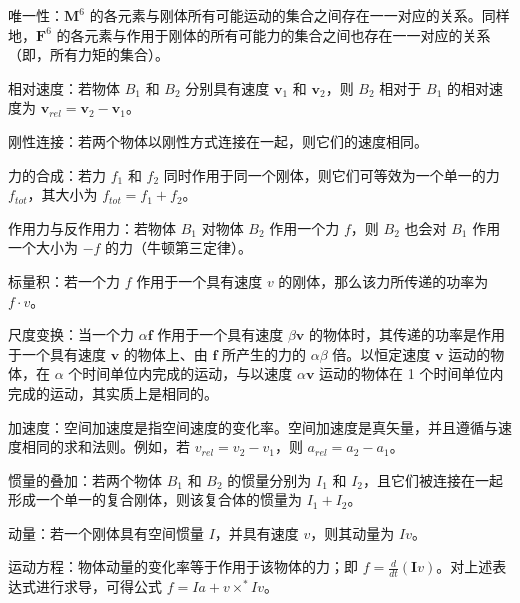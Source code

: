 \documentclass[10pt,a4paper]{book}
\theoremstyle{thmstyle} %
\theoremstyle{defstyle} %
\theoremstyle{prostyle} %
\begin{document}
唯一性：$\mathbf{M}^{6}$ 的各元素与刚体所有可能运动的集合之间存在一一对应的关系。同样地，$\mathbf{F}^{6}$ 的各元素与作用于刚体的所有可能力的集合之间也存在一一对应的关系（即，所有力矩的集合）。



相对速度：若物体 $B_{1}$ 和 $B_{2}$ 分别具有速度 $\boldsymbol{v}_{1}$ 和 $\boldsymbol{v}_{2}$，则 $B_{2}$ 相对于 $B_{1}$ 的相对速度为 $\boldsymbol{v}_{rel}=\boldsymbol{v}_{2}-\boldsymbol{v}_{1}$。



刚性连接：若两个物体以刚性方式连接在一起，则它们的速度相同。



力的合成：若力 $f_{1}$ 和 $f_{2}$ 同时作用于同一个刚体，则它们可等效为一个单一的力 $f_{tot}$，其大小为 $f_{tot} = f_{1} + f_{2}$。



作用力与反作用力：若物体 $B_{1}$ 对物体 $B_{2}$ 作用一个力 $f$，则 $B_{2}$ 也会对 $B_{1}$ 作用一个大小为 $-f$ 的力（牛顿第三定律）。



标量积：若一个力 $f$ 作用于一个具有速度 $v$ 的刚体，那么该力所传递的功率为 $f \cdot v$。



尺度变换：当一个力 $\alpha\boldsymbol{f}$ 作用于一个具有速度 $\beta\boldsymbol{v}$ 的物体时，其传递的功率是作用于一个具有速度 $\boldsymbol{v}$ 的物体上、由 $\boldsymbol{f}$ 所产生的力的 $\alpha\beta$ 倍。以恒定速度 $\boldsymbol{v}$ 运动的物体，在 $\alpha$ 个时间单位内完成的运动，与以速度 $\alpha\boldsymbol{v}$ 运动的物体在 1 个时间单位内完成的运动，其实质上是相同的。



加速度：空间加速度是指空间速度的变化率。空间加速度是真矢量，并且遵循与速度相同的求和法则。例如，若 $v_{rel} = v_2 - v_1$，则 $a_{rel} = a_2 - a_1$。



惯量的叠加：若两个物体 $B_{1}$ 和 $B_{2}$ 的惯量分别为 $I_{1}$ 和 $I_{2}$，且它们被连接在一起形成一个单一的复合刚体，则该复合体的惯量为 $I_{1} + I_{2}$。



动量：若一个刚体具有空间惯量 $I$，并具有速度 $v$，则其动量为 $Iv$。



运动方程：物体动量的变化率等于作用于该物体的力；即 $f = \frac{d}{dt}(\mathbf{I}v)$。对上述表达式进行求导，可得公式 $f = Ia + v \times^* Iv$。
\end{document}
